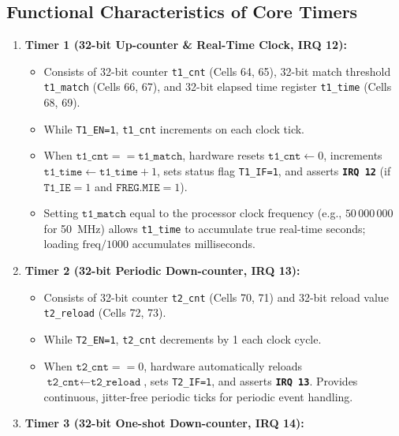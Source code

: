 \documentclass[11pt,a4paper]{article}
\begin{document}
\subsection{Functional Characteristics of Core Timers}

\begin{archcallout}[title={Timer Subsystem Architectural Specifications}]
\begin{enumerate}
    \item \textbf{Timer 1 (32-bit Up-counter \& Real-Time Clock, IRQ 12):}
    \begin{itemize}
        \item Consists of 32-bit counter \texttt{t1\_cnt} (Cells 64, 65), 32-bit match threshold \texttt{t1\_match} (Cells 66, 67), and 32-bit elapsed time register \texttt{t1\_time} (Cells 68, 69).
        \item While \texttt{T1\_EN=1}, \texttt{t1\_cnt} increments on each clock tick.
        \item When \(\texttt{t1\_cnt} == \texttt{t1\_match}\), hardware resets \(\texttt{t1\_cnt} \leftarrow 0\), increments \(\texttt{t1\_time} \leftarrow \texttt{t1\_time} + 1\), sets status flag \texttt{T1\_IF=1}, and asserts \textbf{\texttt{IRQ 12}} (if \(\texttt{T1\_IE}=1\) and \(\texttt{FREG.MIE}=1\)).
        \item Setting \(\texttt{t1\_match}\) equal to the processor clock frequency (e.g., \(50\,000\,000\) for 50~MHz) allows \texttt{t1\_time} to accumulate true real-time seconds; loading \(\text{freq} / 1000\) accumulates milliseconds.
    \end{itemize}
    \item \textbf{Timer 2 (32-bit Periodic Down-counter, IRQ 13):}
    \begin{itemize}
        \item Consists of 32-bit counter \texttt{t2\_cnt} (Cells 70, 71) and 32-bit reload value \texttt{t2\_reload} (Cells 72, 73).
        \item While \texttt{T2\_EN=1}, \texttt{t2\_cnt} decrements by 1 each clock cycle.
        \item When \(\texttt{t2\_cnt} == 0\), hardware automatically reloads \(\texttt{t2\_cnt} \leftarrow \texttt{t2\_reload}\), sets \texttt{T2\_IF=1}, and asserts \textbf{\texttt{IRQ 13}}. Provides continuous, jitter-free periodic ticks for periodic event handling.
    \end{itemize}
    \item \textbf{Timer 3 (32-bit One-shot Down-counter, IRQ 14):}

\end{enumerate}
\end{archcallout}
\end{document}

